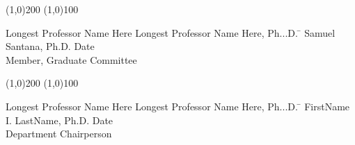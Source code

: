   \noindent
\line(1,0){200} \hspace{40 mm} \line(1,0){100}\\
  \noindent
\vspace{-1.75\baselineskip}
  \begin{tabbing}
Longest Professor Name Here Longest Professor Name Here, Ph...D.   \=  \kill 
Samuel Santana, Ph.D. \>  Date\\Member, Graduate Committee %
\end{tabbing}



  \noindent
  \line(1,0){200} \hspace{40 mm} \line(1,0){100}\\
  \noindent
\vspace{-1.75\baselineskip}
  \begin{tabbing}
Longest Professor Name Here Longest Professor Name Here, Ph...D.  \=  \kill 
FirstName I. LastName, Ph.D. \>  Date\\Department Chairperson  %
\end{tabbing}
